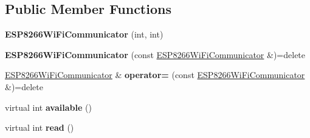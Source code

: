 \subsection*{Public Member Functions}
\begin{DoxyCompactItemize}
\item 
\mbox{\label{classwood_box_1_1communication_1_1wifi_1_1_e_s_p8266_wi_fi_communicator_a0af11f50c19c8d00112e61e7919294ef}} 
{\bfseries E\+S\+P8266\+Wi\+Fi\+Communicator} (int, int)
\item 
\mbox{\label{classwood_box_1_1communication_1_1wifi_1_1_e_s_p8266_wi_fi_communicator_a7e7137815f9b6d8dc18adcef1ccb13cc}} 
{\bfseries E\+S\+P8266\+Wi\+Fi\+Communicator} (const \mbox{\hyperlink{classwood_box_1_1communication_1_1wifi_1_1_e_s_p8266_wi_fi_communicator}{E\+S\+P8266\+Wi\+Fi\+Communicator}} \&)=delete
\item 
\mbox{\label{classwood_box_1_1communication_1_1wifi_1_1_e_s_p8266_wi_fi_communicator_a422e4ef0462beca6e66a5909b41966ef}} 
\mbox{\hyperlink{classwood_box_1_1communication_1_1wifi_1_1_e_s_p8266_wi_fi_communicator}{E\+S\+P8266\+Wi\+Fi\+Communicator}} \& {\bfseries operator=} (const \mbox{\hyperlink{classwood_box_1_1communication_1_1wifi_1_1_e_s_p8266_wi_fi_communicator}{E\+S\+P8266\+Wi\+Fi\+Communicator}} \&)=delete
\item 
\mbox{\label{classwood_box_1_1communication_1_1wifi_1_1_e_s_p8266_wi_fi_communicator_aa73f46aaaf5441b79dd4a15be293aeb4}} 
virtual int {\bfseries available} ()
\item 
\mbox{\label{classwood_box_1_1communication_1_1wifi_1_1_e_s_p8266_wi_fi_communicator_a3bd1c8f72256e92c6dbdab9272fd3543}} 
virtual int {\bfseries read} ()
\item 
\mbox{\label{classwood_box_1_1communication_1_1wifi_1_1_e_s_p8266_wi_fi_communicator_accc6832fa7351cb977b9e3a805dc8107}} 

\end{DoxyCompactItemize}
